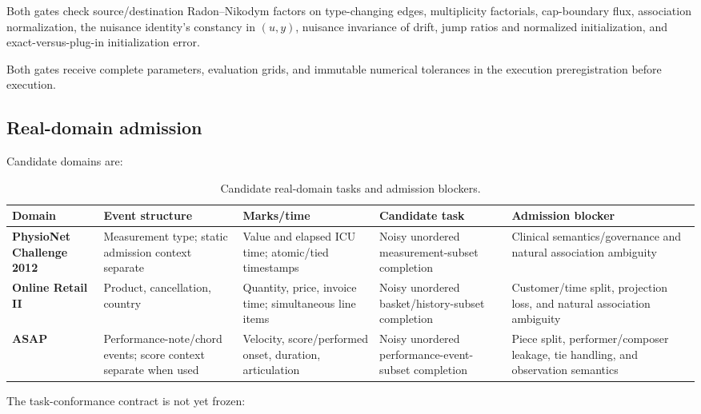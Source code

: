 \documentclass[11pt]{article}
\begin{document}
Both gates check source/\allowbreak{}destination Radon--Nikodym factors on type-changing edges, multiplicity factorials, cap-boundary flux, association normalization, the nuisance identity's constancy in \((u,y)\), nuisance invariance of drift, jump ratios and normalized initialization, and exact-versus-plug-in initialization error.

Both gates receive complete parameters, evaluation grids, and immutable numerical tolerances in the execution preregistration before execution.

\subsection{Real-domain admission}
\label{sec:real-domain-admission}

Candidate domains are:

\begin{table}[htbp]
\centering
\footnotesize
\renewcommand{\arraystretch}{1.18}
\setlength{\tabcolsep}{3.5pt}
\caption{Candidate real-domain tasks and admission blockers.}\label{tab:domain-admission}
\begin{tabularx}{\linewidth}{@{}*{5}{Y}@{}}
\toprule
\textbf{Domain} & \textbf{Event structure} & \textbf{Marks/\allowbreak{}time} & \textbf{Candidate task} & \textbf{Admission blocker} \\
\midrule
\textbf{PhysioNet Challenge 2012} & Measurement type; static admission context separate & Value and elapsed ICU time; atomic/\allowbreak{}tied timestamps & Noisy unordered measurement-subset completion & Clinical semantics/\allowbreak{}governance and natural association ambiguity \\
\textbf{Online Retail II} & Product, cancellation, country & Quantity, price, invoice time; simultaneous line items & Noisy unordered basket/\allowbreak{}history-subset completion & Customer/\allowbreak{}time split, projection loss, and natural association ambiguity \\
\textbf{ASAP} & Performance-note/\allowbreak{}chord events; score context separate when used & Velocity, score/\allowbreak{}performed onset, duration, articulation & Noisy unordered performance-event-subset completion & Piece split, performer/\allowbreak{}composer leakage, tie handling, and observation semantics \\
\bottomrule
\end{tabularx}
\end{table}

The task-conformance contract is not yet frozen:
\end{document}
